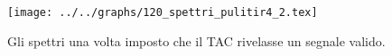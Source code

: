 \begin{figure}[h] \centering\texttt{[image: ../../graphs/120\_spettri\_pulitir4\_2.tex]}\caption{Gli spettri una volta imposto che il TAC rivelasse un segnale valido. }\label{gr:120_spettri_pulitir4_2} \end{figure}
